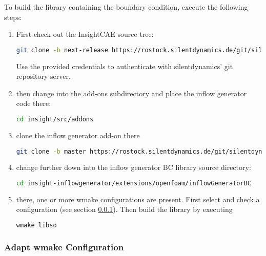 \documentclass{sd_report}
\begin{document}
To build the library containing the boundary condition, execute the following steps:
\begin{enumerate}
\item First check out the InsightCAE source tree:

\begin{lstlisting}[language=bash]
git clone -b next-release https://rostock.silentdynamics.de/git/silentdynamics/insight.git
\end{lstlisting}

Use the provided credentials to authenticate with silentdynamics' git repository server.

\item then change into the add-ons subdirectory and place the inflow generator code there:

\begin{lstlisting}[language=bash]
cd insight/src/addons
\end{lstlisting}

\item clone the inflow generator add-on there

\begin{lstlisting}[language=bash]
git clone -b master https://rostock.silentdynamics.de/git/silentdynamics/insight-inflowgenerator.git
\end{lstlisting}

\item change further down into the inflow generator BC library source directory:

\begin{lstlisting}[language=bash]
cd insight-inflowgenerator/extensions/openfoam/inflowGeneratorBC
\end{lstlisting}

\item there, one or more wmake configurations are present. First select and check a configuration (see section \ref{sec:inflw_wmake}). Then build the library by executing

\begin{lstlisting}[language=bash]
wmake libso
\end{lstlisting}

\end{enumerate}

\subsubsection{Adapt wmake Configuration}
\label{sec:inflw_wmake}
\end{document}
